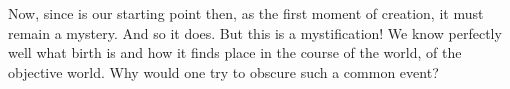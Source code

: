 



\pa Now, since  is our starting point then, as the first moment of
creation, it must remain a mystery. And so it does. But this is a mystification!
We know perfectly well what birth is and how it finds place in the course of the
world, of the objective world. Why would one try to obscure such a common event?

